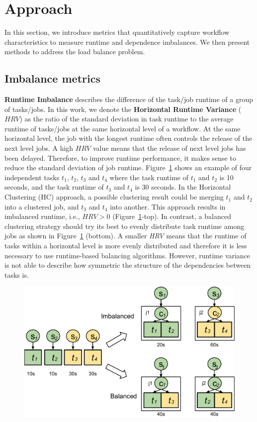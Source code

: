 \section{Approach}


 In this section, we introduce metrics that quantitatively capture workflow characteristics to measure runtime and dependence imbalances. We then present methods to address the load balance problem.



\subsection{Imbalance metrics}

\textbf{Runtime Imbalance} describes the difference of the task/job runtime of a group of tasks/jobs. In this work, we denote the \textbf{Horizontal Runtime Variance} ($HRV$) as the ratio of the standard deviation in task runtime to the average runtime of tasks/jobs at the same horizontal level of a workflow. At the same horizontal level, the job with the longest runtime often controls the release of the next level jobs. A high $HRV$ value means that the release of next level jobs has been delayed. Therefore, to improve runtime performance, it makes sense to reduce the standard deviation of job runtime. Figure~\ref{fig:imbalance_rv} shows an example of four independent tasks $t_1$, $t_2$, $t_3$ and $t_4$ where the task runtime of $t_1$ and $t_2$ is 10 seconds, and the task runtime of $t_3$ and $t_4$ is 30 seconds. In the Horizontal Clustering (HC) approach, a possible clustering result could be merging $t_1$ and $t_2$ into a clustered job, and $t_3$ and $t_4$ into another. This approach results in imbalanced runtime, i.e., $HRV > 0$ (Figure~\ref{fig:imbalance_rv}-top). In contrast, a balanced clustering strategy should try its best to evenly distribute task runtime among jobs as shown in Figure~\ref{fig:imbalance_rv} (bottom). A smaller \emph{HRV} means that the runtime of tasks within a horizontal level is more evenly distributed and therefore it is less necessary to use runtime-based balancing algorithms. However, runtime variance is not able to describe how symmetric the structure of the dependencies between tasks is.

\begin{figure}[htb]
	\centering
	\includegraphics[width=0.8\linewidth]{figures/balance/figure5.pdf}
	\label{fig:imbalance_rv}
\end{figure}


